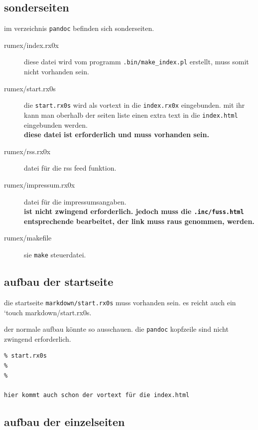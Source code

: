 \subsection{sonderseiten}\label{sonderseiten}

im verzeichnis \texttt{pandoc} befinden sich sonderseiten.

\begin{description}
\item[rumex/index.rx0x]
diese datei wird vom programm \texttt{.bin/make\_index.pl} erstellt,
muss somit nicht vorhanden sein.
\item[rumex/start.rx0s]
die \texttt{start.rx0s} wird als vortext in die \texttt{index.rx0x}
eingebunden. mit ihr kann man oberhalb der seiten liste einen extra text
in die \texttt{index.html} eingebunden werden.\\\textbf{diese datei ist
erforderlich und muss vorhanden sein.}
\item[rumex/rss.rx0x]
datei für die rss feed funktion.
\item[rumex/impressum.rx0x]
datei für die impressumsangaben.\\\textbf{ist nicht zwingend
erforderlich. jedoch muss die \texttt{.inc/fuss.html} entsprechende
bearbeitet, der link muss raus genommen, werden.}
\item[rumex/makefile]
sie \texttt{make} steuerdatei.
\end{description}

\subsection{aufbau der startseite}\label{aufbau-der-startseite}

die startseite \texttt{markdown/start.rx0s} muss vorhanden sein. es
reicht auch ein `touch markdown/start.rx0s.

der normale aufbau könnte so ausschauen. die \texttt{pandoc} kopfzeile
sind nicht zwingend erforderlich.

\begin{verbatim}
% start.rx0s
%
%

hier kommt auch schon der vortext für die index.html
\end{verbatim}

\subsection{aufbau der einzelseiten}\label{aufbau-der-einzelseiten}

